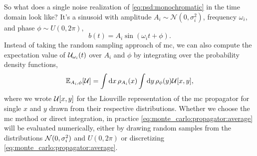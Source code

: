 So what does a single noise realization of \cref{eq:psd:monochromatic} in the time domain look like? 
It's a sinusoid with amplitude $A_i \sim \mathcal{N}(0, \sigma_i^2)$, frequency $\omega_i$, and phase $\phi \sim U(0, 2\pi)$,
\begin{equation}
    b(t) = A_i\sin(\omega_i t + \phi).
\end{equation}
Instead of taking the random sampling approach of \gls{mc}, we can also compute the expectation value of $\mathcal{U}_{\omega_i}(t)$ over $A_i$ and $\phi$ by integrating over the probability density functions,
\begin{equation}
    \label{eq:monte_carlo:propagator:average}
    \mathbb{E}_{A_i,\phi}[\mathcal{U}] = \int\dd{x}\rho_{A_i}(x)\int\dd{y}\rho_{\phi}(y)\mathcal{U}[x, y],
\end{equation}
where we wrote $\mathcal{U}[x, y]$ for the Liouville representation of the \gls{mc} propagator for single $x$ and $y$ drawn from their respective distributions.
Whether we choose the \gls{mc} method or direct integration, in practice \cref{eq:monte_carlo:propagator:average} will be evaluated numerically, either by drawing random samples from the distributions $\mathcal{N}(0, \sigma_i^2)$ and $U(0,2\pi)$ or discretizing \cref{eq:monte_carlo:propagator:average}.

